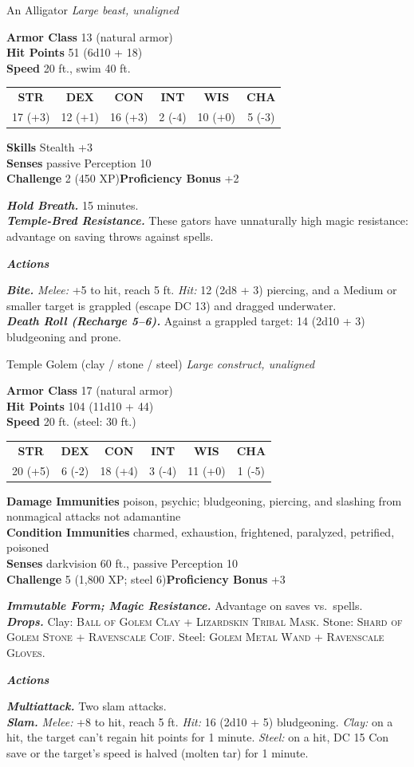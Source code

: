 \documentclass[10pt,twoside]{article}
\newcommand{\abilities}[6]{%
\begin{center}\small
\setlength{\tabcolsep}{6pt}\renewcommand{\arraystretch}{1.05}
\begin{tabular}{cccccc}
\textbf{STR}&\textbf{DEX}&\textbf{CON}&\textbf{INT}&\textbf{WIS}&\textbf{CHA}\\[1pt]
#1&#2&#3&#4&#5&#6\\
\end{tabular}\end{center}}
\newcommand{\sbrule}{\par\vspace{2pt}\noindent{\color{bloodred}\rule{\linewidth}{1.1pt}}\par\vspace{2pt}}
\newcommand{\eqname}[1]{\textsc{#1}}
\begin{document}
\begin{statblock}{An Alligator}
\textit{Large beast, unaligned}\sbrule
\textbf{Armor Class} 13 (natural armor)\\
\textbf{Hit Points} 51 (6d10 + 18)\\
\textbf{Speed} 20 ft., swim 40 ft.\sbrule
\abilities{17 (+3)}{12 (+1)}{16 (+3)}{2 (-4)}{10 (+0)}{5 (-3)}
\sbrule
\textbf{Skills} Stealth +3\\
\textbf{Senses} passive Perception 10\\
\textbf{Challenge} 2 (450 XP)\hfill\textbf{Proficiency Bonus} +2\sbrule
\textbf{\textit{Hold Breath.}} 15 minutes.\\
\textbf{\textit{Temple-Bred Resistance.}} These gators have unnaturally high magic
resistance: advantage on saving throws against spells.\sbrule
\textit{\textbf{Actions}}\par
\textbf{\textit{Bite.}} \textit{Melee:} +5 to hit, reach 5 ft. \textit{Hit:} 12 (2d8
+ 3) piercing, and a Medium or smaller target is grappled (escape DC 13) and dragged
underwater.\\
\textbf{\textit{Death Roll (Recharge 5--6).}} Against a grappled target: 14 (2d10 + 3)
bludgeoning and prone.
\end{statblock}

\begin{statblock}{Temple Golem \textnormal{(clay / stone / steel)}}
\textit{Large construct, unaligned}\sbrule
\textbf{Armor Class} 17 (natural armor)\\
\textbf{Hit Points} 104 (11d10 + 44)\\
\textbf{Speed} 20 ft. (steel: 30 ft.)\sbrule
\abilities{20 (+5)}{6 (-2)}{18 (+4)}{3 (-4)}{11 (+0)}{1 (-5)}
\sbrule
\textbf{Damage Immunities} poison, psychic; bludgeoning, piercing, and slashing from
nonmagical attacks not adamantine\\
\textbf{Condition Immunities} charmed, exhaustion, frightened, paralyzed, petrified,
poisoned\\
\textbf{Senses} darkvision 60 ft., passive Perception 10\\
\textbf{Challenge} 5 (1,800 XP; steel 6)\hfill\textbf{Proficiency Bonus} +3\sbrule
\textbf{\textit{Immutable Form; Magic Resistance.}} Advantage on saves vs.\ spells.\\
\textbf{\textit{Drops.}} Clay: \eqname{Ball of Golem Clay} + \eqname{Lizardskin
Tribal Mask}. Stone: \eqname{Shard of Golem Stone} + \eqname{Ravenscale Coif}. Steel:
\eqname{Golem Metal Wand} + \eqname{Ravenscale Gloves}.\sbrule
\textit{\textbf{Actions}}\par
\textbf{\textit{Multiattack.}} Two slam attacks.\\
\textbf{\textit{Slam.}} \textit{Melee:} +8 to hit, reach 5 ft. \textit{Hit:} 16 (2d10
+ 5) bludgeoning. \emph{Clay:} on a hit, the target can't regain hit points for 1
minute. \emph{Steel:} on a hit, DC 15 Con save or the target's speed is halved (molten
tar) for 1 minute.
\end{statblock}
\end{document}

